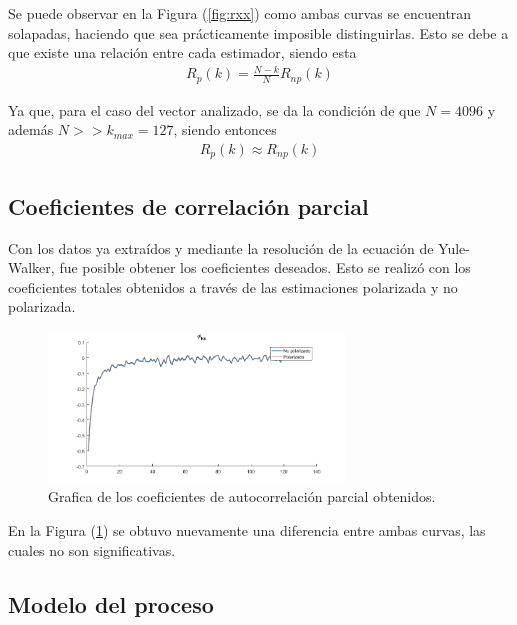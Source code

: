 Se puede observar en la Figura (\ref{fig:rxx}) como ambas curvas se encuentran solapadas, haciendo que sea prácticamente imposible distinguirlas.
Esto se debe a que existe una relación entre cada estimador, siendo esta
\begin{equation*}
\begin{gathered}
	R_{p}(k) = \frac{N - k}{N} R_{np}(k)
\end{gathered}
\end{equation*}

Ya que, para el caso del vector analizado, se da la condición de que $N = 4096$ y además $N >> k_{max} = 127$, siendo entonces
\begin{equation*}
\begin{gathered}
	R_{p}(k) \approx R_{np}(k)
\end{gathered}
\end{equation*}

\subsection{Coeficientes de correlación parcial}

Con los datos ya extraídos y mediante la resolución de la ecuación de Yule-Walker, fue posible obtener los coeficientes deseados. Esto se realizó con los coeficientes totales obtenidos a través de las estimaciones polarizada y no polarizada.
\begin{figure}[H]
\centering
	\includegraphics[width=0.7\textwidth, trim = {0 0 0 0.7cm},clip]{./ImagenesEjercicio2/phikk.png}
	\caption{Grafica de los coeficientes de autocorrelación parcial obtenidos.}
	\label{fig:phikk}
\end{figure}

En la Figura (\ref{fig:phikk}) se obtuvo nuevamente una diferencia entre ambas curvas, las cuales no son significativas.

\subsection{Modelo del proceso}
\label{subsec:modelo}

